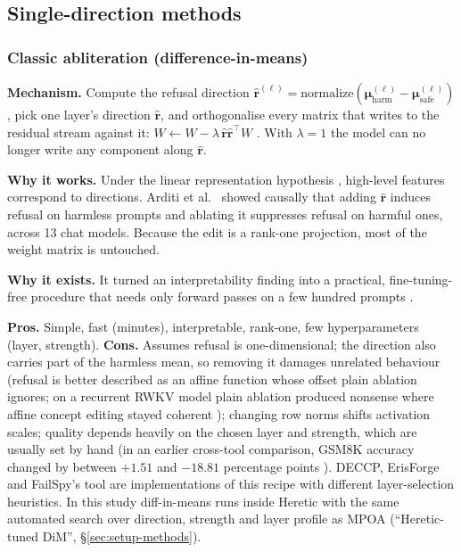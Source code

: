\subsection{Single-direction methods}

\subsubsection{Classic abliteration (difference-in-means)}
\label{sec:m-dim}
\textbf{Mechanism.} Compute the refusal direction
$\hat{\mathbf{r}}^{(\ell)} =
\mathrm{normalize}(\boldsymbol{\mu}^{(\ell)}_{\mathrm{harm}} -
\boldsymbol{\mu}^{(\ell)}_{\mathrm{safe}})$, pick one layer's direction
$\hat{\mathbf{r}}$, and orthogonalise every matrix that writes to the residual
stream against it:
$W \leftarrow W - \lambda\,\hat{\mathbf{r}}\hat{\mathbf{r}}^{\top} W$
\cite{arditi2024refusal}. With $\lambda=1$ the model can no longer write any
component along $\hat{\mathbf{r}}$.

\textbf{Why it works.} Under the linear representation hypothesis
\cite{park2024linear}, high-level features correspond to directions.
Arditi et al.~\cite{arditi2024refusal} showed causally that adding $\hat{\mathbf{r}}$
induces refusal on harmless prompts and ablating it suppresses refusal on
harmful ones, across 13 chat models. Because the edit is a rank-one projection,
most of the weight matrix is untouched.

\textbf{Why it exists.} It turned an interpretability finding into a
practical, fine-tuning-free procedure that needs only forward passes on a few
hundred prompts \cite{labonne2024abliteration,failspy_abliterator}.

\textbf{Pros.} Simple, fast (minutes), interpretable, rank-one, few
hyperparameters (layer, strength).
\textbf{Cons.} Assumes refusal is one-dimensional; the direction also carries
part of the harmless mean, so removing it damages unrelated behaviour (refusal
is better described as an affine function whose offset plain ablation ignores;
on a recurrent RWKV model plain ablation produced nonsense where affine concept
editing stayed coherent \cite{marshall2024refusal}); changing row norms shifts
activation scales; quality depends heavily on the chosen layer and strength,
which are usually set by hand (in an earlier cross-tool comparison, GSM8K
accuracy changed by between $+1.51$ and $-18.81$ percentage points
\cite{young2025comparative}). DECCP, ErisForge and
FailSpy's tool are implementations of this recipe with different layer-selection
heuristics. In this study diff-in-means runs inside Heretic with the same
automated search over direction, strength and layer profile as MPOA
(``Heretic-tuned DiM'', \S\ref{sec:setup-methods}).


